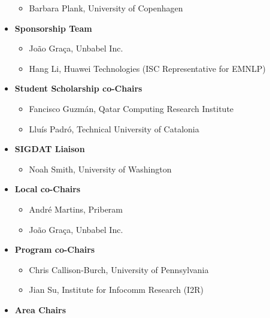 \begin{itemize}[itemsep=7pt, leftmargin=0cm, label={}]
\begin{itemize}[nosep, leftmargin=0.5cm, label={}]
\item Barbara Plank, University of Copenhagen 
\end{itemize}
\item \textbf{Sponsorship Team}

\begin{itemize}[nosep, leftmargin=0.5cm, label={}]
\item João Graça, Unbabel Inc. 
\item Hang Li, Huawei Technologies (ISC Representative for EMNLP) 
\end{itemize}
\item \textbf{Student Scholarship co-Chairs}

\begin{itemize}[nosep, leftmargin=0.5cm, label={}]
\item Fancisco Guzmán, Qatar Computing Research Institute
\item Lluís Padró, Technical University of Catalonia
\end{itemize}
\item \textbf{SIGDAT Liaison}

\begin{itemize}[nosep, leftmargin=0.5cm, label={}]
\item Noah Smith, University of Washington
\end{itemize}
\item \textbf{Local co-Chairs}

\begin{itemize}[nosep, leftmargin=0.5cm, label={}]
\item André Martins, Priberam 
\item João Graça, Unbabel Inc. 
\end{itemize}
\item \textbf{Program co-Chairs}

\begin{itemize}[nosep, leftmargin=0.5cm, label={}]
\item Chris Callison-Burch, University of Pennsylvania
\item Jian Su, Institute for Infocomm Research (I2R)
\end{itemize}
\item \textbf{Area Chairs}


\end{itemize}

